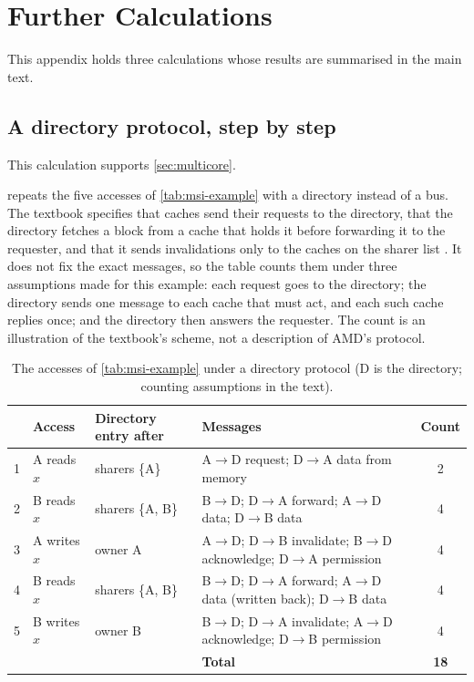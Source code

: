 \clearpage
\section{Further Calculations}
\label{app:worked-examples}

This appendix holds three calculations whose results are summarised in the main text.

\subsection{A directory protocol, step by step}
\label{app:directory-example}
This calculation supports \cref{sec:multicore}.

 repeats the five accesses of \cref{tab:msi-example} with a directory instead of a bus. The textbook specifies that caches send their requests to the directory, that the directory fetches a block from a cache that holds it before forwarding it to the requester, and that it sends invalidations only to the caches on the sharer list \cite[sec.~12.4.6]{sarangi2025basic}. It does not fix the exact messages, so the table counts them under three assumptions made for this example: each request goes to the directory; the directory sends one message to each cache that must act, and each such cache replies once; and the directory then answers the requester. The count is an illustration of the textbook's scheme, not a description of AMD's protocol.

\begin{table}[htbp]
  \centering
  \caption[The five accesses of the MSI trace under a directory protocol]{The accesses of \cref{tab:msi-example} under a directory protocol (D is the directory; counting assumptions in the text).}
  \label{tab:directory-example}
  \small
  \begin{tabularx}{\textwidth}{@{}l>{\raggedright\arraybackslash}p{2.2cm}>{\raggedright\arraybackslash}p{2.6cm}>{\raggedright\arraybackslash}Xc@{}}
    \toprule
    & \textbf{Access} & \textbf{Directory entry after} & \textbf{Messages} & \textbf{Count} \\
    \midrule
    1 & A reads $x$ & sharers \{A\} & A$\to$D request; D$\to$A data from memory & 2 \\
    2 & B reads $x$ & sharers \{A, B\} & B$\to$D; D$\to$A forward; A$\to$D data; D$\to$B data & 4 \\
    3 & A writes $x$ & owner A & A$\to$D; D$\to$B invalidate; B$\to$D acknowledge; D$\to$A permission & 4 \\
    4 & B reads $x$ & sharers \{A, B\} & B$\to$D; D$\to$A forward; A$\to$D data (written back); D$\to$B data & 4 \\
    5 & B writes $x$ & owner B & B$\to$D; D$\to$A invalidate; A$\to$D acknowledge; D$\to$B permission & 4 \\
    \midrule
    & & & \textbf{Total} & \textbf{18} \\
    \bottomrule
  \end{tabularx}
\end{table}

